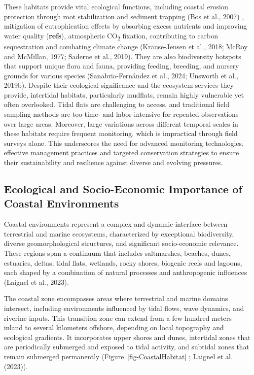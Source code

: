 \documentclass[
  letterpaper,
  11pt,
  english,
  singlespacing,
  headsepline]{MastersDoctoralThesis}
\begin{document}
\begin{spacing}{1.5}
These habitats provide vital ecological functions, including coastal
erosion protection through root stabilization and sediment trapping (Bos
et al., 2007) , mitigation of eutrophication effects by absorbing excess
nutrients and improving water quality (\textbf{refs}), atmospheric
CO\textsubscript{2} fixation, contributing to carbon sequestration and
combating climate change (Krause-Jensen et al., 2018; McRoy and
McMillan, 1977; Saderne et al., 2019). They are also biodiversity
hotspots that support unique flora and fauna, providing feeding,
breeding, and nursery grounds for various species (Sanabria-Fernández et
al., 2024; Unsworth et al., 2019b). Despite their ecological
significance and the ecosystem services they provide, intertidal
habitats, particularly mudflats, remain highly vulnerable yet often
overlooked. Tidal flats are challenging to access, and traditional field
sampling methods are too time- and labor-intensive for repeated
observations over large areas. Moreover, large variations across
different temporal scales in these habitats require frequent monitoring,
which is impractical through field surveys alone. This underscores the
need for advanced monitoring technologies, effective management
practices and targeted conservation strategies to ensure their
sustainability and resilience against diverse and evolving pressures.

\subsection{Ecological and Socio-Economic Importance of Coastal
Environments}\label{ecological-and-socio-economic-importance-of-coastal-environments}

Coastal environments represent a complex and dynamic interface between
terrestrial and marine ecosystems, characterized by exceptional
biodiversity, diverse geomorphological structures, and significant
socio-economic relevance. These regions span a continuum that includes
saltmarshes, beaches, dunes, estuaries, deltas, tidal flats, wetlands,
rocky shores, biogenic reefs and lagoons, each shaped by a combination
of natural processes and anthropogenic influences (Laignel et al.,
2023).

The coastal zone encompasses areas where terrestrial and marine domains
intersect, including environments influenced by tidal flows, wave
dynamics, and riverine inputs. This transition zone can extend from a
few hundred meters inland to several kilometers offshore, depending on
local topography and ecological gradients. It incorporates upper shores
and dunes, intertidal zones that are periodically submerged and exposed
to tidal activity, and subtidal zones that remain submerged permanently
(Figure~\ref{fig-CoastalHabitat} ; Laignel et al. (2023)).


\end{spacing}
\end{document}
